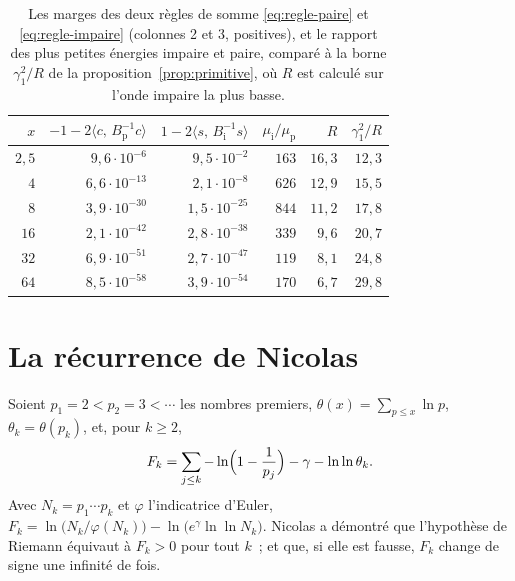 \documentclass[11pt,a4paper]{article}
\theoremstyle{definition}
\theoremstyle{remark}
\newcommand{\ps}[2]{\langle #1,\,#2\rangle}
\begin{document}
\begin{table}[ht]\centering\small
\begin{tabular}{rrrrrr}\toprule
$x$ & $-1-2\ps c{B_{\mathrm p}^{-1}c}$ & $1-2\ps s{B_{\mathrm i}^{-1}s}$ & $\mu_{\mathrm i}/\mu_{\mathrm p}$ & $R$ & $\gamma_1^2/R$\\\midrule
$2{,}5$ & $9{,}6\cdot 10^{-6}$ & $9{,}5\cdot 10^{-2}$ & $163$ & $16{,}3$ & $12{,}3$ \\
$4$ & $6{,}6\cdot 10^{-13}$ & $2{,}1\cdot 10^{-8}$ & $626$ & $12{,}9$ & $15{,}5$ \\
$8$ & $3{,}9\cdot 10^{-30}$ & $1{,}5\cdot 10^{-25}$ & $844$ & $11{,}2$ & $17{,}8$ \\
$16$ & $2{,}1\cdot 10^{-42}$ & $2{,}8\cdot 10^{-38}$ & $339$ & $9{,}6$ & $20{,}7$ \\
$32$ & $6{,}9\cdot 10^{-51}$ & $2{,}7\cdot 10^{-47}$ & $119$ & $8{,}1$ & $24{,}8$ \\
$64$ & $8{,}5\cdot 10^{-58}$ & $3{,}9\cdot 10^{-54}$ & $170$ & $6{,}7$ & $29{,}8$ \\\bottomrule
\end{tabular}
\caption{Les marges des deux règles de somme \eqref{eq:regle-paire} et \eqref{eq:regle-impaire} (colonnes 2 et 3, positives),
et le rapport des plus petites énergies impaire et paire, comparé à la borne $\gamma_1^2/R$ de la proposition~\ref{prop:primitive},
où $R$ est calculé sur l'onde impaire la plus basse.}\label{tab:sommes}
\end{table}

\section{La récurrence de Nicolas}

Soient $p_1=2<p_2=3<\cdots$ les nombres premiers, $\theta(x)=\sum_{p\le x}\ln p$, $\theta_k=\theta(p_k)$, et, pour $k\ge2$,
\[
F_k=\sum_{j\le k}-\ln\Bigl(1-\frac1{p_j}\Bigr)-\gamma-\ln\ln\theta_k .
\]
Avec $N_k=p_1\cdots p_k$ et $\varphi$ l'indicatrice d'Euler, $F_k=\ln\bigl(N_k/\varphi(N_k)\bigr)-\ln\bigl(e^\gamma\ln\ln N_k\bigr)$.
Nicolas \cite{nicolas} a démontré que l'hypothèse de Riemann équivaut à $F_k>0$ pour tout $k$~; et que, si elle est fausse,
$F_k$ change de signe une infinité de fois.
\end{document}
